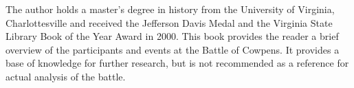 The author holds a master's degree in history from the University of Virginia,
Charlottesville and received the Jefferson Davis Medal and the Virginia State
Library Book of the Year Award in 2000. This book provides the reader a brief
overview of the participants and events at the Battle of Cowpens. It provides a
base of knowledge for further research, but is not recommended as a reference
for actual analysis of the battle. 
